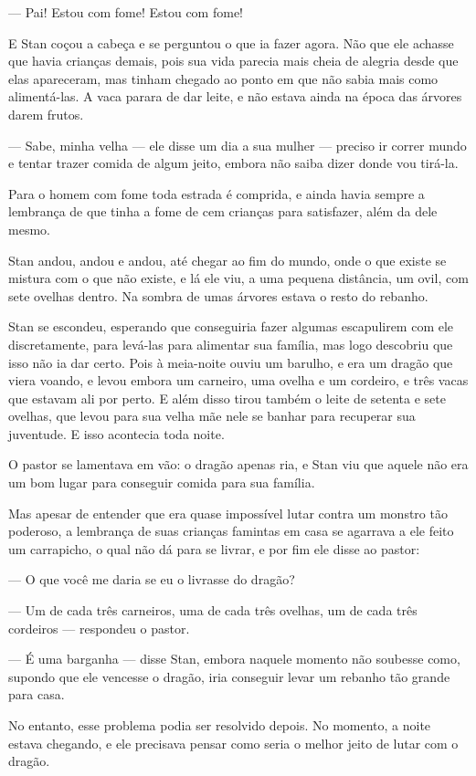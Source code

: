 — Pai! Estou com fome! Estou com fome! 

E Stan coçou a cabeça e se perguntou o que ia fazer agora. Não que ele
achasse que havia crianças demais, pois sua vida parecia mais cheia
de alegria desde que elas apareceram, mas tinham chegado ao ponto em
que não sabia mais como alimentá-las. A vaca parara de dar leite, e
não estava ainda na época das árvores darem frutos.

— Sabe, minha velha — ele disse um dia a sua mulher — preciso ir
correr mundo e tentar trazer comida de algum jeito, embora não saiba
dizer donde vou tirá-la.

Para o homem com fome toda estrada é comprida, e ainda havia sempre a
lembrança de que tinha a fome de cem crianças para satisfazer, além
da dele mesmo.

Stan andou, andou e andou, até chegar ao fim do mundo, onde o que
existe se mistura com o que não existe, e lá ele viu, a uma pequena
distância, um ovil, com sete ovelhas dentro. Na sombra de umas
árvores estava o resto do rebanho.

Stan se escondeu, esperando que conseguiria fazer algumas escapulirem
com ele discretamente, para levá-las para alimentar sua família, mas
logo descobriu que isso não ia dar certo. Pois à meia-noite ouviu um
barulho, e era um dragão que viera voando, e levou embora um
carneiro, uma ovelha e um cordeiro, e três vacas que estavam ali por
perto. E além disso tirou também o leite de setenta e sete ovelhas,
que levou para sua velha mãe nele se banhar para recuperar sua
juventude. E isso acontecia toda noite.

O pastor se lamentava em vão: o dragão apenas ria, e Stan viu que
aquele não era um bom lugar para conseguir comida para sua família.

Mas apesar de entender que era quase impossível lutar contra um
monstro tão poderoso, a lembrança de suas crianças famintas em casa
se agarrava a ele feito um carrapicho, o qual não dá para se livrar,
e por fim ele disse ao pastor:

— O que você me daria se eu o livrasse do dragão?

— Um de cada três carneiros, uma de cada três ovelhas, um de cada três
cordeiros — respondeu o pastor.

— É uma barganha — disse Stan, embora naquele momento não soubesse
como, supondo que ele vencesse o dragão, iria conseguir levar um
rebanho tão grande para casa.

No entanto, esse problema podia ser resolvido depois. No momento, a
noite estava chegando, e ele precisava pensar como seria o melhor
jeito de lutar com o dragão.

